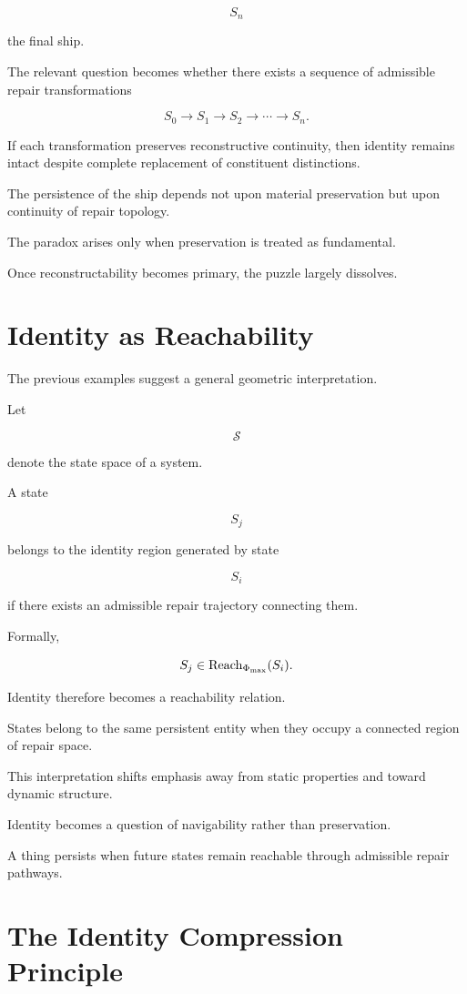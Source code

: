 \documentclass[12pt,oneside]{book}
\theoremstyle{plain} \newtheorem{theorem}{Theorem}[chapter] \newtheorem{lemma}[theorem]{Lemma} \newtheorem{proposition}[theorem]{Proposition} \newtheorem{corollary}[theorem]{Corollary}
\theoremstyle{definition} \newtheorem{definition}[theorem]{Definition} \newtheorem{axiom}[theorem]{Axiom} \newtheorem{construction}[theorem]{Construction}
\theoremstyle{remark} \newtheorem{remark}[theorem]{Remark} \newtheorem{example}[theorem]{Example}
\begin{document}
\[
S_n
\]

the final ship.

The relevant question becomes whether there exists a sequence of admissible repair transformations

\[
S_0
\rightarrow
S_1
\rightarrow
S_2
\rightarrow
\cdots
\rightarrow
S_n.
\]

If each transformation preserves reconstructive continuity, then identity remains intact despite complete replacement of constituent distinctions.

The persistence of the ship depends not upon material preservation but upon continuity of repair topology.

The paradox arises only when preservation is treated as fundamental.

Once reconstructability becomes primary, the puzzle largely dissolves.

\section{Identity as Reachability}

The previous examples suggest a general geometric interpretation.

Let

\[
\mathcal S
\]

denote the state space of a system.

A state

\[
S_j
\]

belongs to the identity region generated by state

\[
S_i
\]

if there exists an admissible repair trajectory connecting them.

Formally,

\[
S_j
\in
\operatorname{Reach}_{\Phi_{\max}}(S_i).
\]

Identity therefore becomes a reachability relation.

States belong to the same persistent entity when they occupy a connected region of repair space.

This interpretation shifts emphasis away from static properties and toward dynamic structure.

Identity becomes a question of navigability rather than preservation.

A thing persists when future states remain reachable through admissible repair pathways.

\section{The Identity Compression Principle}
\end{document}
